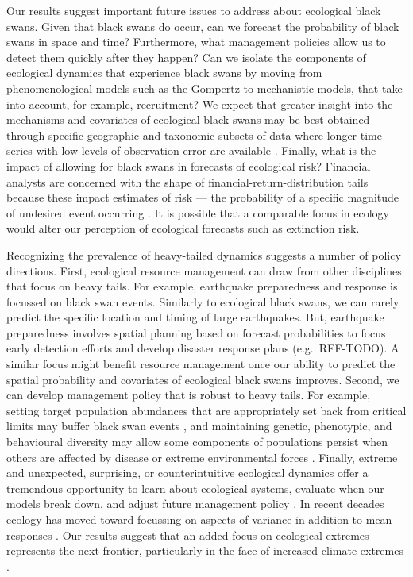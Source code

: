 Our results suggest important future issues to address about ecological black
swans. Given that black swans do occur, can we forecast the probability of
black swans in space and time? Furthermore, what management policies allow us
to detect them quickly after they happen? Can we isolate the components of
ecological dynamics that experience black swans by moving from phenomenological
models such as the Gompertz to mechanistic models, that take into account, for
example, recruitment? We expect that greater insight into the mechanisms and
covariates of ecological black swans may be best obtained through specific
geographic and taxonomic subsets of data where longer time series with low
levels of observation error are available \citep[e.g.][]{segura2013}. Finally,
what is the impact of allowing for black swans in forecasts of ecological risk?
Financial analysts are concerned with the shape of
financial-return-distribution tails because these impact estimates of risk ---
the probability of a specific magnitude of undesired event occurring
\citep{rachev2008}. It is possible that a comparable focus in ecology would
alter our perception of ecological forecasts such as extinction risk.

Recognizing the prevalence of heavy-tailed dynamics suggests a number of policy
directions. First, ecological resource management can draw from other
disciplines that focus on heavy tails. For example, earthquake preparedness and
response is focussed on black swan events. Similarly to ecological black swans,
we can rarely predict the specific location and timing of large earthquakes.
But, earthquake preparedness involves spatial planning based on forecast
probabilities to focus early detection efforts and develop disaster response
plans (e.g.~REF-TODO). A similar focus might benefit resource management once
our ability to predict the spatial probability and covariates of ecological
black swans improves. Second, we can develop management policy that is robust
to heavy tails. For example, setting target population abundances that are
appropriately set back from critical limits may buffer black swan events
\citep[e.g.][]{caddy1996}, and maintaining genetic, phenotypic, and behavioural
diversity may allow some components of populations persist when others are
affected by disease or extreme environmental forces
\citep[e.g.][]{schindler2010, anderson2014}. Finally, extreme and unexpected,
surprising, or counterintuitive ecological dynamics offer a tremendous
opportunity to learn about ecological systems, evaluate when our models break
down, and adjust future management policy \citep{doak2008, pine-iii2009,
  lindenmayer2010}. In recent decades ecology has moved toward focussing on
aspects of variance in addition to mean responses \citep[e.g.][]{loreau2010a,
  thompson2013}. Our results suggest that an added focus on ecological extremes
represents the next frontier, particularly in the face of increased climate
extremes \citep{meehl2004,ipcc2012}.

